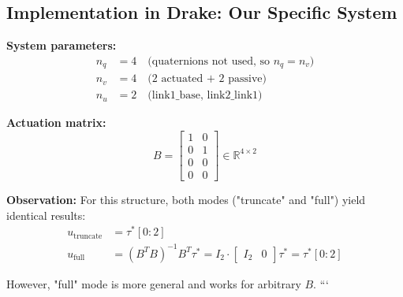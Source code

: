 \subsection*{Implementation in Drake: Our Specific System}

\textbf{System parameters:}
\begin{align}
n_q &= 4 \quad \text{(quaternions not used, so } n_q = n_v\text{)} \\
n_v &= 4 \quad \text{(2 actuated + 2 passive)} \\
n_u &= 2 \quad \text{(link1\_base, link2\_link1)}
\end{align}

\textbf{Actuation matrix:}
\begin{equation}
B = \begin{bmatrix}
1 & 0 \\
0 & 1 \\
0 & 0 \\
0 & 0
\end{bmatrix} \in \mathbb{R}^{4 \times 2}
\end{equation}

\textbf{Observation:} For this structure, both modes ("truncate" and "full") yield identical results:
\begin{align}
u_{\text{truncate}} &= \tau^*[0:2] \\
u_{\text{full}} &= (B^T B)^{-1}B^T\tau^* = I_2 \cdot \begin{bmatrix} I_2 & 0 \end{bmatrix} \tau^* = \tau^*[0:2]
\end{align}

However, "full" mode is more general and works for arbitrary $B$.
```